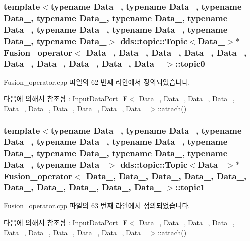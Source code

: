 \subsubsection[{\texorpdfstring{topic0}{topic0}}]{\setlength{\rightskip}{0pt plus 5cm}template$<$typename Data\+\_, typename Data\+\_, typename Data\+\_, typename Data\+\_, typename Data\+\_, typename Data\+\_, typename Data\+\_, typename Data\+\_, typename Data\+\_, typename Data\+\_$>$ dds\+::topic\+::\+Topic$<$Data\+\_$>$$\ast$ {\bf Fusion\+\_\+operator}$<$ Data\+\_, Data\+\_, Data\+\_, Data\+\_, Data\+\_, Data\+\_, Data\+\_, Data\+\_, Data\+\_, Data\+\_ $>$\+::topic0}\hypertarget{classFusion__operator_a378e811778586da6619a1d6c2d1c5f37}{}\label{classFusion__operator_a378e811778586da6619a1d6c2d1c5f37}


Fusion\+\_\+operator.\+cpp 파일의 62 번째 라인에서 정의되었습니다.



다음에 의해서 참조됨 \+:  Input\+Data\+Port\+\_\+\+F$<$ Data\+\_, Data\+\_, Data\+\_, Data\+\_, Data\+\_, Data\+\_, Data\+\_, Data\+\_, Data\+\_, Data\+\_ $>$\+::attach().

\subsubsection[{\texorpdfstring{topic1}{topic1}}]{\setlength{\rightskip}{0pt plus 5cm}template$<$typename Data\+\_, typename Data\+\_, typename Data\+\_, typename Data\+\_, typename Data\+\_, typename Data\+\_, typename Data\+\_, typename Data\+\_, typename Data\+\_, typename Data\+\_$>$ dds\+::topic\+::\+Topic$<$Data\+\_$>$$\ast$ {\bf Fusion\+\_\+operator}$<$ Data\+\_, Data\+\_, Data\+\_, Data\+\_, Data\+\_, Data\+\_, Data\+\_, Data\+\_, Data\+\_, Data\+\_ $>$\+::topic1}\hypertarget{classFusion__operator_a79543a848dd9ac2cb01f9e38acf2b988}{}\label{classFusion__operator_a79543a848dd9ac2cb01f9e38acf2b988}


Fusion\+\_\+operator.\+cpp 파일의 63 번째 라인에서 정의되었습니다.



다음에 의해서 참조됨 \+:  Input\+Data\+Port\+\_\+\+F$<$ Data\+\_, Data\+\_, Data\+\_, Data\+\_, Data\+\_, Data\+\_, Data\+\_, Data\+\_, Data\+\_, Data\+\_ $>$\+::attach().

